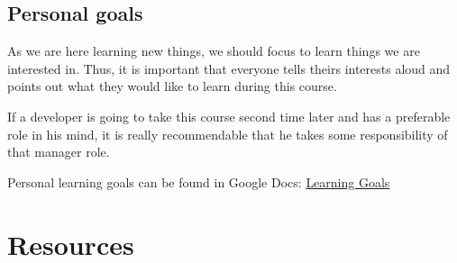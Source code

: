 \begin{table}[H]
\center
{}
\caption{Project goals in the priority order}
\label{table:Projectgoals}
\end{table}


\subsection{Personal goals}

As we are here learning new things, we should focus to learn things we are interested in. Thus, it is important that everyone tells theirs interests aloud and points out what they would like to learn during this course. 

If a developer is going to take this course second time later and has a preferable role in his mind, it is really recommendable that he takes some responsibility of that manager role.

Personal learning goals can be found in Google Docs: 
\href{https://docs.google.com/spreadsheet/ccc?key=0Ahu59q_GwtcedHJZdjQ1RWROZFYxa
0RTcWp3MkJkTnc&usp=sharing}{Learning Goals}

\section{Resources}
